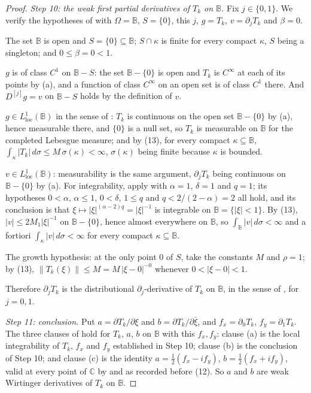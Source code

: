 \begin{proof}
\emph{Step 10: the weak first partial derivatives of $T_k$ on $\mathbb{B}$.}
Fix $j\in\{0,1\}$.  We verify the hypotheses of
 with $\Omega=\mathbb{B}$, $S=\{0\}$, this
$j$, $g=T_k$, $v=\partial_jT_k$ and $\beta=0$.

The set $\mathbb{B}$ is open and $S=\{0\}\subseteq\mathbb{B}$; $S\cap\kappa$ is
finite for every compact $\kappa$, $S$ being a singleton; and
$0\le\beta=0<1$.

$g$ is of class $C^1$ on $\mathbb{B}-S$: the set $\mathbb{B}-\{0\}$ is open and
$T_k$ is $C^\infty$ at each of its points by (a), and a function of class
$C^\infty$ on an open set is of class $C^1$ there.  And $D^{[j]}g=v$ on
$\mathbb{B}-S$ holds by the definition of $v$.

$g\in L^1_{\mathrm{loc}}(\mathbb{B})$ in the sense of :
$T_k$ is continuous on the open set $\mathbb{B}-\{0\}$ by (a), hence
measurable there, and $\{0\}$ is a null set, so $T_k$ is measurable on
$\mathbb{B}$ for the completed Lebesgue measure; and by (13), for every
compact $\kappa\subseteq\mathbb{B}$,
$\int_\kappa|T_k|\,d\sigma\le M\,\sigma(\kappa)<\infty$, $\sigma(\kappa)$
being finite because $\kappa$ is bounded.

$v\in L^1_{\mathrm{loc}}(\mathbb{B})$: measurability is the same argument,
$\partial_jT_k$ being continuous on $\mathbb{B}-\{0\}$ by (a).  For
integrability, apply  with $\alpha=1$,
$\delta=1$ and $q=1$; its hypotheses $0<\alpha$, $\alpha\le1$, $0<\delta$,
$1\le q$ and $q<2/(2-\alpha)=2$ all hold, and its conclusion is that
$\xi\mapsto|\xi|^{(\alpha-2)q}=|\xi|^{-1}$ is integrable on
$\mathbb{B}=\{|\xi|<1\}$.  By (13), $|v|\le2M_1|\xi|^{-1}$ on
$\mathbb{B}-\{0\}$, hence almost everywhere on $\mathbb{B}$, so
$\int_{\mathbb{B}}|v|\,d\sigma<\infty$ and a fortiori
$\int_\kappa|v|\,d\sigma<\infty$ for every compact $\kappa\subseteq\mathbb{B}$.

The growth hypothesis: at the only point $0$ of $S$, take the constants $M$
and $\rho=1$; by (13), $\|T_k(\xi)\|\le M=M\,|\xi-0|^{-0}$ whenever
$0<|\xi-0|<1$.

Therefore $\partial_jT_k$ is the distributional $\partial_j$-derivative of
$T_k$ on $\mathbb{B}$, in the sense of , for
$j=0,1$.

\emph{Step 11: conclusion.}  Put
$a=\partial T_k/\partial\xi$ and $b=\partial T_k/\partial\bar\xi$, and
$f_x=\partial_0T_k$, $f_y=\partial_1T_k$.  The three clauses of
 hold for $T_k$, $a$, $b$ on $\mathbb{B}$ with this
$f_x,f_y$: clause (a) is the local integrability of $T_k$, $f_x$ and $f_y$
established in Step 10; clause (b) is the conclusion of Step 10; and clause
(c) is the identity
$a=\tfrac12(f_x-if_y)$, $b=\tfrac12(f_x+if_y)$, valid at every point of
$\mathbb{C}$ by  and  as recorded before (12).  So
$a$ and $b$ are weak Wirtinger derivatives of $T_k$ on $\mathbb{B}$.


\end{proof}
